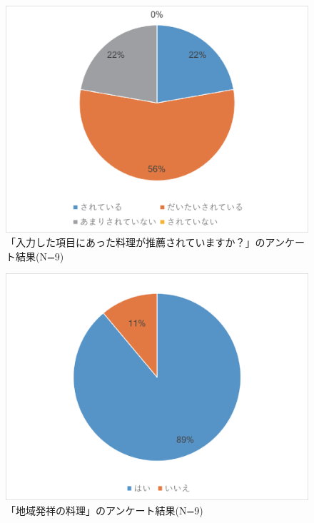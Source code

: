 \documentclass{funthesis}
\begin{document}
\begin{figure}[tbp]
  \begin{center}
    \includegraphics[clip,width=12cm]{5.3.eps}
    \caption[「入力した項目にあった料理が推薦されていますか？」のアンケート結果]{「入力した項目にあった料理が推薦されていますか？」のアンケート結果(N=9)}
  \end{center}
\end{figure}

\begin{figure}[tbp]
  \begin{center}
    \includegraphics[clip,width=12cm]{5.4.eps}
    \caption[「地域発祥の料理」のアンケート結果]{「地域発祥の料理」のアンケート結果(N=9)}
  \end{center}
\end{figure}
\end{document}

